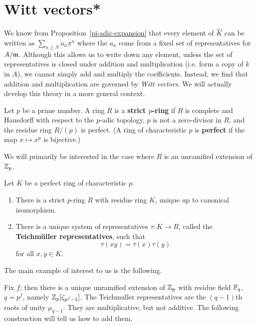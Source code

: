 \section{Witt vectors*}
We know from Proposition~\ref{pi-adic-expansion} that every element of $\hat{K}$ can be written as $\sum_{n\ge N} a_n\pi^n$ where the $a_n$ come from a fixed set of representatives for $A/\mathfrak{m}$. Although this allows us to write down any element, unless the set of representatives is closed under addition and multiplication (i.e. form a copy of $k$ in $A$), we cannot simply add and multiply the coefficients. Instead, we find that addition and multiplication are governed by {\it Witt vectors}. We will actually develop this theory in a more general context.
\begin{df}
Let $p$ be a prime number. A ring $R$ is a \textbf{strict $p$-ring} if $R$ is complete and Hausdorff with respect to the $p$-adic topology, $p$ is not a zero-divisor in $R$, and the residue ring $R/(p)$ is perfect. (A ring of characteristic $p$ is \textbf{perfect} if the map $x\mapsto x^p$ is bijective.)
\end{df}
We will primarily be interested in the case where $R$ is an unramified extension of $\mathbb{Z}_p$. %
\begin{thm}
Let $K$ be a perfect ring of characteristic $p$.
\begin{enumerate}
\item
There is a strict $p$-ring $R$ with residue ring $K$, unique up to canonical isomorphism.
\item
There is a unique system of representatives $\tau:K\to R$, called the \textbf{Teichm\"uller representatives}, such that 
\[
\tau(xy)=\tau(x)\tau(y)
\]
for all $x,y\in K$.
\end{enumerate}
\end{thm}
The main example of interest to us is the following.
\begin{ex}
Fix $f$; then there is a unique unramified extension of $\mathbb{Z}_p$ with residue field $\mathbb{F}_q$, $q=p^f$, namely $\mathbb{Z}_p[\zeta_{p^f-1}]$. The Teichmuller representatives are the $(q-1)$th roots of unity $\mu_{q-1}$. They are multiplicative, but not additive. The following construction will tell us how to add them.
\end{ex}

